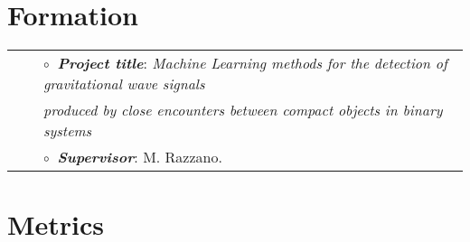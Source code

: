 
\section{Formation}

\vspace{-0.1cm}
\begin{tabular}{rcl}
&\hspace{0.4cm} &$\circ\;\;${\textbf{\textit{Project title}}}: \textit{Machine Learning methods for the detection of gravitational wave signals}\\&\hspace{0.4cm} &
\textit{\phantom{Project title    }produced by close encounters between compact objects in binary systems}\\
&\hspace{0.4cm} &$\circ\;\;${\textbf{\textit{Supervisor}}}:  M. Razzano.\\
\end{tabular}
\vspace{0.2cm}


\section{Metrics}




\vspace{0.2cm}






\vspace{0.2cm}






